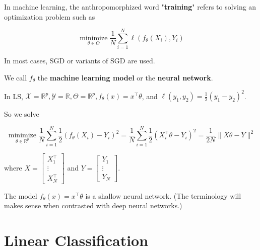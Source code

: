 \begin{concept}
    In machine learning, the anthropomorphized word "\textbf{training}" refers to solving an optimization problem such as

    $$
    \underset{\theta \in \Theta}{\operatorname{minimize}} \frac{1}{N} \sum_{i=1}^{N} \ell\left(f_{\theta}\left(X_{i}\right), Y_{i}\right)
    $$

    In most cases, SGD or variants of SGD are used.

    We call $f_{\theta}$ the \textbf{machine learning model} or the \textbf{neural network}.
\end{concept}

\begin{example}
    In LS, $\mathcal{X}=\mathbb{R}^{p}, \mathcal{Y}=\mathbb{R}, \Theta=\mathbb{R}^{p}, f_{\theta}(x)=x^{\top} \theta$, and $\ell\left(y_{1}, y_{2}\right)=\frac{1}{2}\left(y_{1}-y_{2}\right)^{2}$.

    So we solve

    $$
    \underset{\theta \in \mathbb{R}^{p}}{\operatorname{minimize}} \frac{1}{N} \sum_{i=1}^{N} \frac{1}{2}\left(f_{\theta}\left(X_{i}\right)-Y_{i}\right)^{2}=\frac{1}{N} \sum_{i=1}^{N} \frac{1}{2}\left(X_{i}^{\top} \theta-Y_{i}\right)^{2}=\frac{1}{2 N}\|X \theta-Y\|^{2}
    $$

    where $X=\left[\begin{array}{c}X_{1}^{\top} \\ \vdots \\ X_{N}^{\top}\end{array}\right]$ and $Y=\left[\begin{array}{c}Y_{1} \\ \vdots \\ Y_{N}\end{array}\right]$.

    The model $f_{\theta}(x)=x^{\top} \theta$ is a shallow neural network. (The terminology will makes sense when contrasted with deep neural networks.)
\end{example}

\section{Linear Classification}

